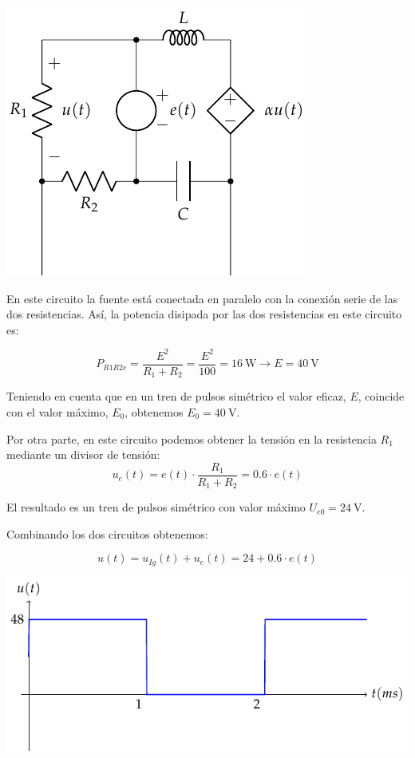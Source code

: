 \documentclass[12pt]{article}
\begin{document}
\begin{center}
  \includegraphics{figs/superposicion3_fuentepulsos}
\end{center}

En este circuito la fuente está conectada en paralelo con la conexión serie de las dos resistencias. Así, la potencia disipada por las dos resistencias en este circuito es:

\begin{equation*}
  P_{R1R2e} = \frac{E^2}{R_1 + R_2} = \frac{E^2}{100} = \SI{16}{\watt} \rightarrow E = \SI{40}{\volt}
\end{equation*}

Teniendo en cuenta que en un tren de pulsos simétrico el valor eficaz, $E$, coincide con el valor máximo, $E_0$, obtenemos $E_0 = \SI{40}{\volt}$.

Por otra parte, en este circuito podemos obtener la tensión en la resistencia $R_1$ mediante un divisor de tensión:
\begin{equation*}
  u_e(t) = e(t) \cdot \frac{R_1}{R_1 + R_2} = 0.6\cdot e(t)
\end{equation*}

El resultado es un tren de pulsos simétrico con valor máximo $U_{e0} = \SI{24}{\volt}$.

Combinando los dos circuitos obtenemos:

\begin{equation*}
  u(t) = u_{Ig}(t) + u_e(t) = 24 + 0.6 \cdot e(t)
\end{equation*}

\begin{center}
  \includegraphics{figs/superposicionOndaCuadrada2}
\end{center}
\end{document}
